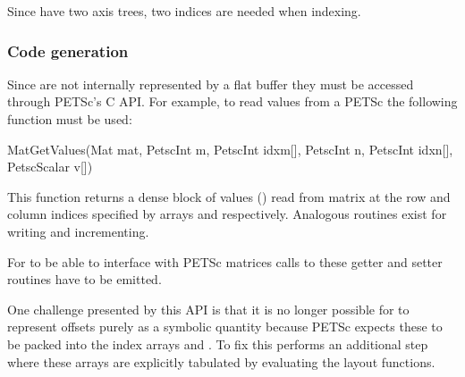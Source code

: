 \documentclass[thesis]{subfiles}
\begin{document}
Since  have two axis trees, two indices are needed when indexing.


\subsubsection{Code generation}

Since  are not internally represented by a flat buffer they must be accessed through PETSc's C API.
For example, to read values from a PETSc  the following function must be used:

\begin{cinline}
  MatGetValues(Mat mat,
               PetscInt m, PetscInt idxm[],
               PetscInt n, PetscInt idxn[],
               PetscScalar v[])
\end{cinline}

This function returns a dense block of values () read from matrix  at the row and column indices specified by arrays  and  respectively.
Analogous routines exist for writing and incrementing.

For  to be able to interface with PETSc matrices calls to these getter and setter routines have to be emitted.

One challenge presented by this API is that it is no longer possible for  to represent offsets purely as a symbolic quantity because PETSc expects these to be packed into the index arrays  and .
To fix this  performs an additional step where these arrays are explicitly tabulated by evaluating the layout functions. %

\end{document}
